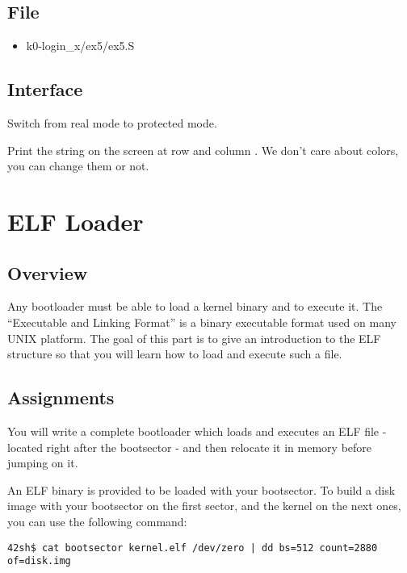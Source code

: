 \subsection*{File}
\begin{itemize}
  \item k0-login\_x/ex5/ex5.S
\end{itemize}

\subsection*{Interface}
{
  Switch from real mode to protected mode.
}

{
  Print the string  on the screen at row 
  and column . We don't care about colors, you can change them
  or not.
}

%
%

\newpage

\section{ELF Loader}

\subsection*{Overview}
Any bootloader must be able to load a kernel binary and to execute it.
The ``Executable and Linking Format'' is a binary executable format used on
many UNIX platform. The goal of this part is to give an introduction to the
ELF structure so that you will learn how to load and execute such a file.

\subsection*{Assignments}
You will write a complete bootloader which loads and executes an ELF file
- located right after the bootsector - and then relocate it in memory
before jumping on it.

An ELF binary is provided to be loaded with your bootsector. To build
a disk image with your bootsector on the first sector, and the kernel on the
next ones, you can use the following command:

\begin{verbatim}
42sh$ cat bootsector kernel.elf /dev/zero | dd bs=512 count=2880 of=disk.img
\end{verbatim}

